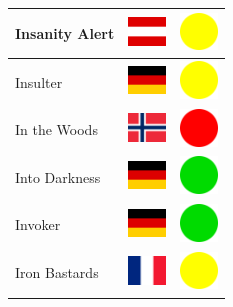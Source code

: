 \documentclass[12pt, a4paper, twoside]{report}
\begin{document}
\begin{center}
\begin{longtable}{|p{5cm}|p{2cm}|p{2cm}|}
 Insanity Alert                                             & \includegraphics[width=1cm]{../4x3/at} &   \includegraphics[width=1cm]{../likes/m} \\ \hline
 Insulter                                                   & \includegraphics[width=1cm]{../4x3/de} &   \includegraphics[width=1cm]{../likes/m} \\ \hline
 In the Woods                                               & \includegraphics[width=1cm]{../4x3/no} &   \includegraphics[width=1cm]{../likes/n} \\ \hline
 Into Darkness                                              & \includegraphics[width=1cm]{../4x3/de} &   \includegraphics[width=1cm]{../likes/y} \\ \hline
 Invoker                                                    & \includegraphics[width=1cm]{../4x3/de} &   \includegraphics[width=1cm]{../likes/y} \\ \hline
 Iron Bastards                                              & \includegraphics[width=1cm]{../4x3/fr} &   \includegraphics[width=1cm]{../likes/m} \\ \hline

\end{longtable}
\end{center}
\end{document}
